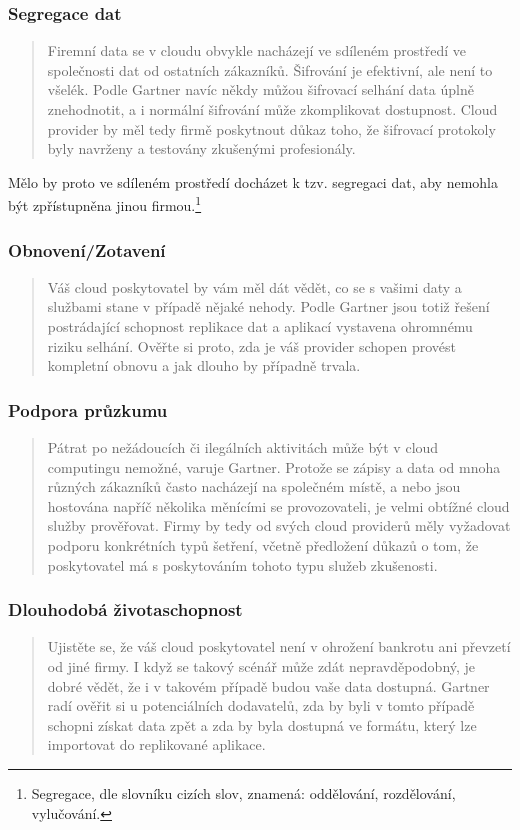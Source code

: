 \subsubsection{Segregace dat}
\begin{quote}
Firemní data se v cloudu obvykle nacházejí ve sdíleném prostředí ve společnosti dat od ostatních zákazníků. Šifrování je efektivní, ale není to všelék. Podle Gartner navíc někdy můžou šifrovací selhání data úplně znehodnotit, a i normální šifrování může zkomplikovat dostupnost. Cloud provider by měl tedy firmě poskytnout důkaz toho, že šifrovací protokoly byly navrženy a testovány zkušenými profesionály.\cite{cloud.cz:7rizik}
\end{quote}
Mělo by proto ve sdíleném prostředí docházet k tzv. segregaci dat, aby nemohla být zpřístupněna jinou firmou.\footnote{Segregace, dle slovníku cizích slov, znamená: oddělování, rozdělování, vylučování.}

\subsubsection{Obnovení/Zotavení}
\begin{quote}
Váš cloud poskytovatel by vám měl dát vědět, co se s vašimi daty a službami stane v případě nějaké nehody. Podle Gartner jsou totiž řešení postrádající schopnost replikace dat a aplikací vystavena ohromnému riziku selhání. Ověřte si proto, zda je váš provider schopen provést kompletní obnovu a jak dlouho by případně trvala.\cite{cloud.cz:7rizik}
\end{quote}

\subsubsection{Podpora průzkumu}
\begin{quote}
Pátrat po nežádoucích či ilegálních aktivitách může být v cloud computingu nemožné, varuje Gartner. Protože se zápisy a data od mnoha různých zákazníků často nacházejí na společném místě, a nebo jsou hostována napříč několika měnícími se provozovateli, je velmi obtížné cloud služby prověřovat. Firmy by tedy od svých cloud providerů měly vyžadovat podporu konkrétních typů šetření, včetně předložení důkazů o tom, že poskytovatel má s poskytováním tohoto typu služeb zkušenosti.\cite{cloud.cz:7rizik}
\end{quote}

\subsubsection{Dlouhodobá životaschopnost}
\begin{quote}
Ujistěte se, že váš cloud poskytovatel není v ohrožení bankrotu ani převzetí od jiné firmy. I když se takový scénář může zdát nepravděpodobný, je dobré vědět, že i v takovém případě budou vaše data dostupná. Gartner radí ověřit si u potenciálních dodavatelů, zda by byli v tomto případě schopni získat data zpět a zda by byla dostupná ve formátu, který lze importovat do replikované aplikace.\cite{cloud.cz:7rizik}
\end{quote}

